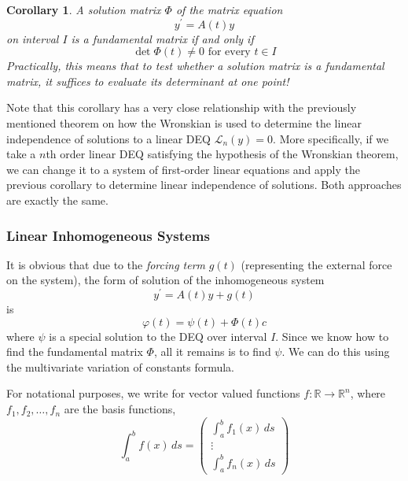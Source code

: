 \documentclass{article}
\newtheorem{corollary}{Corollary}[theorem]
\theoremstyle{remark}
\theoremstyle{definition}
\begin{document}
      \begin{corollary}
      A solution matrix $\Phi$ of the matrix equation 
      \[y^\prime = A(t) y\]
      on interval $I$ is a fundamental matrix if and only if 
      \[\det{\Phi(t)} \neq 0 \text{ for every } t \in I\]
      Practically, this means that to test whether a solution matrix is a fundamental matrix, it suffices to evaluate its determinant at one point! 
      \end{corollary}

      Note that this corollary has a very close relationship with the previously mentioned theorem on how the Wronskian is used to determine the linear independence of solutions to a linear DEQ $\mathcal{L}_n (y) = 0$. More specifically, if we take a $n$th order linear DEQ satisfying the hypothesis of the Wronskian theorem, we can change it to a system of first-order linear equations and apply the previous corollary to determine linear independence of solutions. Both approaches are exactly the same. 

    \subsubsection{Linear Inhomogeneous Systems}

      It is obvious that due to the \textit{forcing term} $g(t)$ (representing the external force on the system), the form of solution of the inhomogeneous system 
      \[y^\prime = A(t) y + g(t)\]
      is 
      \[\varphi(t) = \psi(t) + \Phi(t) c\]
      where $\psi$ is a special solution to the DEQ over interval $I$. Since we know how to find the fundamental matrix $\Phi$, all it remains is to find $\psi$. We can do this using the multivariate variation of constants formula. 

      For notational purposes, we write for vector valued functions $f: \mathbb{R} \longrightarrow \mathbb{R}^n$, where $f_1, f_2, \ldots, f_n$ are the basis functions, 
      \[\int_a^b f(x)\,ds = \begin{pmatrix}
      \int_a^b f_1 (x)\,ds \\ \vdots \\ \int_a^b f_n(x)\,ds
      \end{pmatrix}\]
\end{document}
